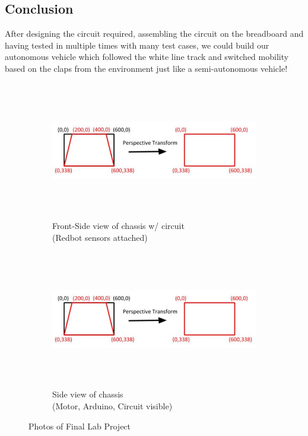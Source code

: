 \documentclass[12pt,a4paper]{article}
\begin{document}
\begin{large}
\section{Conclusion}
After designing the circuit required, assembling the circuit on the breadboard and having tested in multiple times with many test cases, we could build our autonomous vehicle which followed the white line track and switched mobility based on the claps from the environment just like a semi-autonomous vehicle! \\
\begin{figure}[!hbp]
\centering
  \begin{subfigure}[b]{0.4\textwidth}
  \centering
  \captionsetup{justification=centering}
    \includegraphics[width=\textwidth, height = 6cm]{images/perspective_transform.jpg}
    \caption{Front-Side view of chassis w/ circuit\\ (Redbot sensors attached)}
    \label{fig:g1}
  \end{subfigure}
  \hspace{1cm}
  \begin{subfigure}[b]{0.4\textwidth}
  \centering
  \captionsetup{justification=centering}
    \includegraphics[width=\textwidth, height = 6cm]{images/perspective_transform.jpg}
    \caption{Side view of chassis \\(Motor, Arduino, Circuit visible)}
    \label{fig:g2}
  \end{subfigure}
  \caption{Photos of Final Lab Project}
\end{figure}


\end{large}
\end{document}

